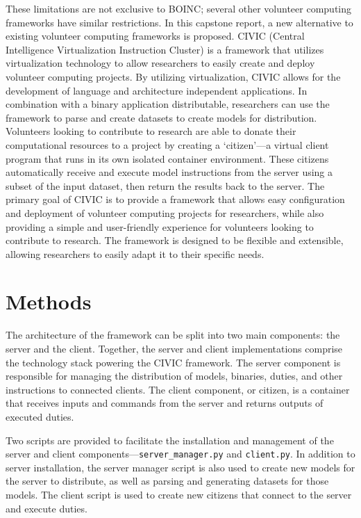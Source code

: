 \documentclass[11pt]{article}
\begin{document}
These limitations are not exclusive to BOINC; several other volunteer computing frameworks have similar restrictions. In this capstone report, a new alternative to existing volunteer computing frameworks is proposed. CIVIC (Central Intelligence Virtualization Instruction Cluster) is a framework that utilizes virtualization technology to allow researchers to easily create and deploy volunteer computing projects. By utilizing virtualization, CIVIC allows for the development of language and architecture independent applications. In combination with a binary application distributable, researchers can use the framework to parse and create datasets to create models for distribution. Volunteers looking to contribute to research are able to donate their computational resources to a project by creating a `citizen'---a virtual client program that runs in its own isolated container environment. These citizens automatically receive and execute model instructions from the server using a subset of the input dataset, then return the results back to the server. The primary goal of CIVIC is to provide a framework that allows easy configuration and deployment of volunteer computing projects for researchers, while also providing a simple and user-friendly experience for volunteers looking to contribute to research. The framework is designed to be flexible and extensible, allowing researchers to easily adapt it to their specific needs.

\section{Methods}

The architecture of the framework can be split into two main components: the server and the client. Together, the server and client implementations comprise the technology stack powering the CIVIC framework. The server component is responsible for managing the distribution of models, binaries, duties, and other instructions to connected clients. The client component, or citizen, is a container that receives inputs and commands from the server and returns outputs of executed duties.

Two scripts are provided to facilitate the installation and management of the server and client components---\verb|server_manager.py| and \verb|client.py|. In addition to server installation, the server manager script is also used to create new models for the server to distribute, as well as parsing and generating datasets for those models. The client script is used to create new citizens that connect to the server and execute duties.
\end{document}
